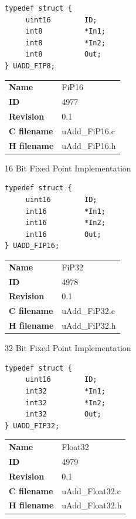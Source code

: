 \begin{lstlisting}
typedef struct {
     uint16        ID;
     int8          *In1;
     int8          *In2;
     int8          Out;
} UADD_FIP8;
\end{lstlisting}

\ifdefined \AddTestReports
{}
\fi
{}
\nopagebreak[0]
\begin{tabular}{l l}
\textbf{Name} & FiP16 \tabularnewline
\textbf{ID} & 4977 \tabularnewline
\textbf{Revision} & 0.1 \tabularnewline
\textbf{C filename} & uAdd\_FiP16.c \tabularnewline
\textbf{H filename} & uAdd\_FiP16.h \tabularnewline
\end{tabular}
\vspace{1ex}

16 Bit Fixed Point Implementation

\begin{lstlisting}
typedef struct {
     uint16        ID;
     int16         *In1;
     int16         *In2;
     int16         Out;
} UADD_FIP16;
\end{lstlisting}

\ifdefined \AddTestReports
{}
\fi
{}
\nopagebreak[0]
\begin{tabular}{l l}
\textbf{Name} & FiP32 \tabularnewline
\textbf{ID} & 4978 \tabularnewline
\textbf{Revision} & 0.1 \tabularnewline
\textbf{C filename} & uAdd\_FiP32.c \tabularnewline
\textbf{H filename} & uAdd\_FiP32.h \tabularnewline
\end{tabular}
\vspace{1ex}

32 Bit Fixed Point Implementation

\begin{lstlisting}
typedef struct {
     uint16        ID;
     int32         *In1;
     int32         *In2;
     int32         Out;
} UADD_FIP32;
\end{lstlisting}

\ifdefined \AddTestReports
{}
\fi
{}
\nopagebreak[0]
\begin{tabular}{l l}
\textbf{Name} & Float32 \tabularnewline
\textbf{ID} & 4979 \tabularnewline
\textbf{Revision} & 0.1 \tabularnewline
\textbf{C filename} & uAdd\_Float32.c \tabularnewline
\textbf{H filename} & uAdd\_Float32.h \tabularnewline
\end{tabular}
\vspace{1ex}

